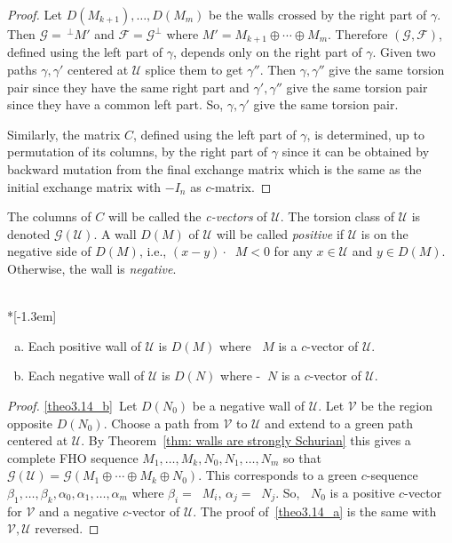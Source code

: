 \documentclass[ALCO,ThmDefs,Unicode,epreuves]{cedram}
\DeclareMathOperator{\undim}{\underline{dim}}
\newcommand{\cF}{\ensuremath{{\mathcal{F}}}}
\newcommand{\cG}{\ensuremath{{\mathcal{G}}}}
\newcommand{\cU}{\ensuremath{{\mathcal{U}}}}
\newcommand{\cV}{\ensuremath{{\mathcal{V}}}}
\begin{document}
\begin{proof}
Let $D(M_{k+1}),\ldots,D(M_m)$ be the walls crossed by the right part of $\gamma$. Then $\cG=\,^\perp M'$ and $\cF=\cG^\perp$ where $M'=M_{k+1}\oplus \cdots\oplus M_m$. Therefore $(\cG,\cF)$, defined using the left part of $\gamma$, depends only on the right part of $\gamma$. Given two paths $\gamma,\gamma'$ centered at $\cU$ splice them to get $\gamma''$. Then $\gamma,\gamma''$ give the same torsion pair since they have the same right part and $\gamma',\gamma''$ give the same torsion pair since they have a common left part. So, $\gamma,\gamma'$ give the same torsion pair. 

Similarly, the matrix $C$, defined using the left part of $\gamma$, is determined, up to permutation of its columns, by the right part of $\gamma$ since it can be obtained by backward mutation from the final exchange matrix which is the same as the initial exchange matrix with $-I_n$ as $c$-matrix.
\end{proof}

The columns of $C$ will be called the \emph{c-vectors} of $\cU$. The torsion class of $\cU$ is denoted $\cG(\cU)$. A wall $D(M)$ of $\cU$ will be called \emph{positive} if $\cU$ is on the negative side of $D(M)$, i.e., $(x-y)\cdot\undim M<0$ for any $x\in \cU$ and $y\in D(M)$. Otherwise, the wall is \emph{negative}.

\begin{theo}\label{thm 3} \ \\*[-1.3em]

\begin{enumerate}[(a)]
\item\label{theo3.14_a}
Each positive wall of $\cU$ is $D(M)$ where $\undim M$ is a $c$-vector of $\cU$.

\item\label{theo3.14_b}
Each negative wall of $\cU$ is $D(N)$ where -$\undim N$ is a $c$-vector of $\cU$.
\end{enumerate}
\end{theo}

\begin{proof}
\ref{theo3.14_b}~Let $D(N_0)$ be a negative wall of $\cU$. Let $\cV$ be the region opposite $D(N_0)$. Choose a path from $\cV$ to $\cU$ and extend to a green path centered at $\cU$. By Theorem~\ref{thm: walls are strongly Schurian} this gives a complete FHO sequence $M_1,\ldots,M_k,N_0,N_1,\ldots,N_m$ so that $\cG(\cU)=\cG(M_1\oplus\cdots\oplus M_k\oplus N_0)$. This corresponds to a green $c$-sequence $\beta_1,\ldots,\beta_k,\alpha_0,\alpha_1,\ldots, \alpha_m$ where $\beta_i=\undim M_i$, $\alpha_j=\undim N_j$. So, $\undim N_0$ is a positive $c$-vector for $\cV$ and a negative $c$-vector of $\cU$. The proof of~\ref{theo3.14_a} is the same with $\cV,\cU$ reversed.
\end{proof}
\end{document}
